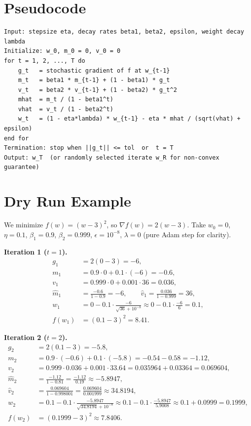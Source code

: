 \documentclass[11pt]{article}
\begin{document}
\section*{Pseudocode}
\begin{verbatim}
Input: stepsize eta, decay rates beta1, beta2, epsilon, weight decay lambda
Initialize: w_0, m_0 = 0, v_0 = 0
for t = 1, 2, ..., T do
    g_t   = stochastic gradient of f at w_{t-1}
    m_t   = beta1 * m_{t-1} + (1 - beta1) * g_t
    v_t   = beta2 * v_{t-1} + (1 - beta2) * g_t^2
    mhat  = m_t / (1 - beta1^t)
    vhat  = v_t / (1 - beta2^t)
    w_t   = (1 - eta*lambda) * w_{t-1} - eta * mhat / (sqrt(vhat) + epsilon)
end for
Termination: stop when ||g_t|| <= tol  or  t = T
Output: w_T  (or randomly selected iterate w_R for non-convex guarantee)
\end{verbatim}

\section*{Dry Run Example}
We minimize $f(w)=(w-3)^2$, so $\nabla f(w)=2(w-3)$.
Take $w_0=0$, $\eta=0.1$, $\beta_1=0.9$, $\beta_2=0.999$,
$\epsilon=10^{-8}$, $\lambda=0$ (pure Adam step for clarity).

\noindent\textbf{Iteration 1 ($t=1$).}
\begin{align*}
g_1 &= 2(0-3) = -6,\\
m_1 &= 0.9\cdot 0 + 0.1\cdot(-6) = -0.6,\\
v_1 &= 0.999\cdot 0 + 0.001\cdot 36 = 0.036,\\
\hat m_1 &= \frac{-0.6}{1-0.9} = -6, \qquad
\hat v_1 = \frac{0.036}{1-0.999} = 36,\\
w_1 &= 0 - 0.1\cdot\frac{-6}{\sqrt{36}+10^{-8}}
     \approx 0 - 0.1\cdot\frac{-6}{6} = 0.1,\\
f(w_1) &= (0.1-3)^2 = 8.41.
\end{align*}

\noindent\textbf{Iteration 2 ($t=2$).}
\begin{align*}
g_2 &= 2(0.1-3) = -5.8,\\
m_2 &= 0.9\cdot(-0.6)+0.1\cdot(-5.8) = -0.54-0.58 = -1.12,\\
v_2 &= 0.999\cdot 0.036 + 0.001\cdot 33.64 = 0.035964+0.03364 = 0.069604,\\
\hat m_2 &= \frac{-1.12}{1-0.81} = \frac{-1.12}{0.19} \approx -5.8947,\\
\hat v_2 &= \frac{0.069604}{1-0.998001} = \frac{0.069604}{0.001999}\approx 34.8194,\\
w_2 &= 0.1 - 0.1\cdot\frac{-5.8947}{\sqrt{34.8194}+10^{-8}}
     \approx 0.1 - 0.1\cdot\frac{-5.8947}{5.9008} \approx 0.1+0.0999=0.1999,\\
f(w_2) &= (0.1999-3)^2 \approx 7.8406.
\end{align*}
\end{document}
